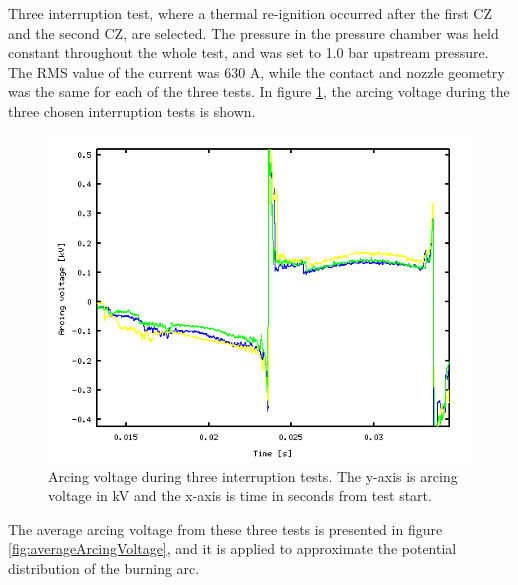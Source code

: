 \documentclass[10pt,b5paper,twoside]{article}
\begin{document}
Three interruption test, where a thermal re-ignition occurred after the first CZ and the second CZ, are selected. The pressure in the pressure chamber was held constant throughout the whole test, and was set to 1.0 bar upstream pressure. The RMS value of the current was 630 A, while the contact and nozzle geometry was the same for each of the three tests. In figure \ref{fig:threeTests}, the arcing voltage during the three chosen interruption tests is shown.

\begin{figure}[H]
\centering
\includegraphics[scale=0.7]{Bilder/Theory/threeTests.png}
\caption{Arcing voltage during three interruption tests. The y-axis is arcing voltage in kV and the x-axis is time in seconds from test start.} \label{fig:threeTests}
\end{figure}

The average arcing voltage from these three tests is presented in figure \ref{fig:averageArcingVoltage}, and it is applied to approximate the potential distribution of the burning arc.
\end{document}
